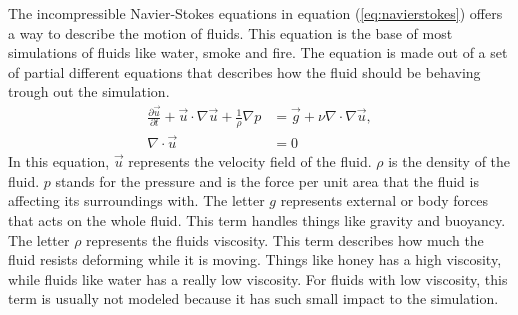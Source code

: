 The incompressible Navier-Stokes equations in equation (\ref{eq:navierstokes}) offers a way to describe the motion of fluids. 
This equation is the base of most simulations of fluids like water, smoke and fire. 
The equation is made out of a set of partial different equations that describes how the fluid should be behaving trough out the simulation.
\begin{equation}
  \label{eq:navierstokes}
  \begin{split} 
    \frac{\partial \vec{u}}{\partial t} + \vec{u} \cdot \nabla \vec{u} + \frac{1}{\rho} \nabla p &= \vec{g} + \nu \nabla \cdot \nabla \vec{u},\\ 
    \nabla\cdot \vec{u} &= 0
  \end{split}
\end{equation}
In this equation, $\vec{u}$ represents the velocity field of the fluid. 
$\rho$ is the density of the fluid. 
$p$ stands for the pressure and is the force per unit area that the fluid is affecting its surroundings with. 
The letter $g$ represents external or body forces that acts on the whole fluid. 
This term handles things like gravity and buoyancy. 
The letter $\rho$ represents the fluids viscosity. 
This term describes how much the fluid resists deforming while it is moving. 
Things like honey has a high viscosity, while fluids like water has a really low viscosity. 
For fluids with low viscosity, this term is usually not modeled because it has such small impact to the simulation.
\\
\\